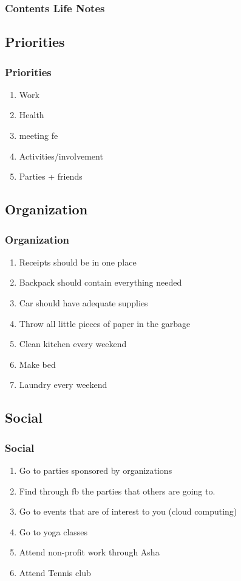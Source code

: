 \begin{frame}
\frametitle{Contents Life Notes}
\tableofcontents[part=1]
\end{frame}

\subsection{Priorities}
\begin{frame}
\frametitle{Priorities}
\begin{enumerate}
\item \small Work
\item \small Health
\item \small meeting fe
\item \small Activities/involvement
\item \small Parties + friends
\end{enumerate} 
\end{frame}

\subsection{Organization}
\begin{frame}
\frametitle{Organization}
\begin{enumerate}
\item \tiny Receipts should be in one place
\item \tiny Backpack should contain everything needed
\item \tiny Car should have adequate supplies
\item \tiny Throw all little pieces of paper in the garbage
\item \tiny Clean kitchen every weekend
\item \tiny Make bed 
\item \tiny Laundry every weekend 
\end{enumerate} 
\end{frame}

\subsection{Social}
\begin{frame} 
\frametitle{Social}
\begin{enumerate} 
\item \tiny Go to parties sponsored by organizations
\item \tiny Find through fb the parties that others are going to. 
\item \tiny Go to events that are of interest to you (cloud computing) 
\item \tiny Go to yoga classes
\item \tiny Attend non-profit work through Asha
\item \tiny Attend Tennis club
\end{enumerate} 
\end{frame} 

